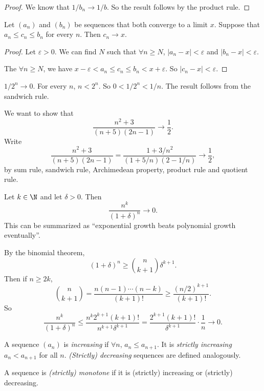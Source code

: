 \documentclass[a4paper]{article}
\begin{document}
\begin{proof}
  We know that $1/b_n \to 1/b$. So the result follows by the product rule.
\end{proof}

\begin{lemma}
  Let $(a_n)$ and $(b_n)$ be sequences that both converge to a limit $x$. Suppose that $a_n \leq c_n \leq b_n$ for every $n$. Then $c_n \to x$.
\end{lemma}

\begin{proof}
  Let $\varepsilon > 0$. We can find $N$ such that $\forall n \geq N$, $|a_n - x| < \varepsilon$ and $|b_n - x| < \varepsilon$.

  The $\forall n\geq N$, we have $x - \varepsilon < a_n \leq c_n \leq b_n < x + \varepsilon$. So $|c_n - x| < \varepsilon$.
\end{proof}

\begin{eg}
  $1/2^n \to 0$. For every $n$, $n < 2^n$. So $0 < 1/2^n < 1/n$. The result follows from the sandwich rule.
\end{eg}
\begin{eg}
  We want to show that
  \[
    \frac{n^2 + 3}{(n + 5)(2n - 1)} \to \frac{1}{2}.
  \]
  Write
      \[
        \frac{n^2 + 3}{(n + 5)(2n - 1)} = \frac{1 + 3/n^2}{(1 + 5/n)(2 - 1/n)} \to \frac{1}{2},
      \]
      by sum rule, sandwich rule, Archimedean property, product rule and quotient rule.
\end{eg}

\begin{eg}
  Let $k\in \N$ and let $\delta > 0$. Then
  \[
    \frac{n^k}{(1 + \delta)^n}\to 0.
  \]
  This can be summarized as ``exponential growth beats polynomial growth eventually''.

  By the binomial theorem,
  \[
    (1 + \delta)^n \geq \binom{n}{k + 1}\delta^{k + 1}.
  \]
  Then if $n\geq 2k$,
  \[
    \binom{n}{k + 1} = \frac{n(n - 1)\cdots(n - k)}{(k + 1)!} \geq \frac{(n/2)^{k + 1}}{(k + 1)!}.
  \]
  So
  \[
    \frac{n^k}{(1 + \delta)^n} \leq \frac{n^k 2^{k + 1} (k+1)!}{n^{k + 1}\delta^{k + 1}} = \frac{2^{k + 1} (k + 1)!}{\delta^{k + 1}} \cdot \frac{1}{n} \to 0.
  \]
\end{eg}

\begin{defi}
  A sequence $(a_n)$ is \emph{increasing} if $\forall n$, $a_n\leq a_{n + 1}$. It is \emph{strictly increasing} $a_n < a_{n + 1}$ for all $n$. \emph{(Strictly) decreasing} sequences are defined analogously.

  A sequence is \emph{(strictly) monotone} if it is (strictly) increasing or (strictly) decreasing.
\end{defi}
\end{document}
